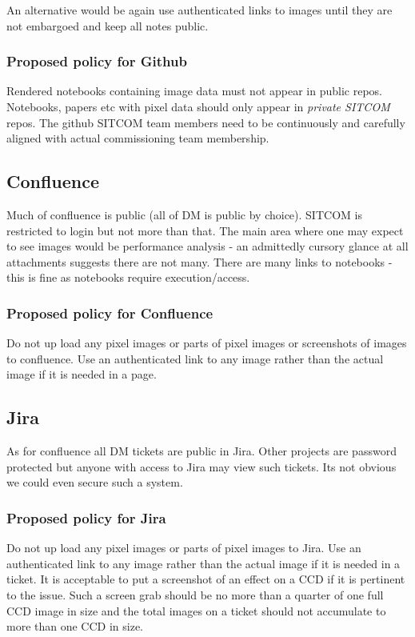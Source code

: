 An alternative would be again use authenticated links to images until they are not embargoed and keep all notes public.

\subsubsection{Proposed policy for Github}
Rendered notebooks containing image data must not appear in public repos.
Notebooks, papers etc with pixel data should only appear in \emph{private SITCOM} repos.
The github SITCOM team members need to be continuously and carefully aligned with actual commissioning team membership.

\subsection{Confluence}
Much of confluence is public (all of DM is public by choice).
SITCOM is restricted to login but not more than that.
The main area where one may expect to see images would be performance analysis - an admittedly  cursory glance at all attachments suggests there are not many.
There are many links to notebooks - this is fine as notebooks require execution/access.

\subsubsection{Proposed policy for Confluence}
Do not up load any pixel images or parts of pixel images or screenshots of images to confluence.
Use an authenticated link to any image rather than the actual image if it is needed in a page.


\subsection{Jira}
As for confluence all DM tickets are public in Jira.
Other projects are password protected but anyone with access to Jira may view such tickets.
Its not obvious we could even secure such a system.

\subsubsection{Proposed policy for Jira}
Do not up load any pixel images or parts of pixel images to Jira.
Use an authenticated link to any image rather than the actual image if it is needed in a ticket.
It is acceptable to put a screenshot of an effect on a CCD if it is pertinent to the issue.
Such a screen grab should be no more than a quarter of  one full CCD image in size and the total images on a ticket should not accumulate to more than one CCD in size.

